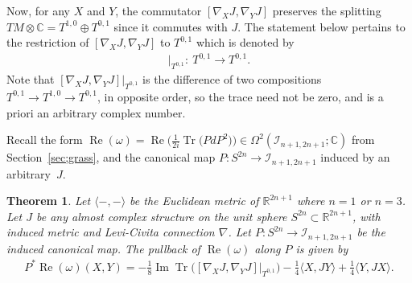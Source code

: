 \documentclass[11pt]{article}
\DeclareMathOperator{\Tr}{Tr}
\newtheorem{thm}{Theorem}[section]
\numberwithin{equation}{section}
\newcommand{\R}{\mathbb{R}}
\newcommand{\CC}{\mathbb{C}}
\newcommand{\cI}{{\mathcal I}}
\begin{document}
 Now, for any $X$ and $Y$, the commutator $[\nabla_X J, \nabla_Y J]$ preserves the splitting $TM \otimes \CC = T^{1,0} \oplus T^{0,1}$ since it commutes with $J$. The statement below pertains to the restriction of $[\nabla_X J, \nabla_Y J]$ to $T^{0,1}$ which is denoted by
 \begin{gather*}
[ \nabla_X J , \nabla_Y J ] \big|_{T^{0,1}} \colon \ T^{0,1} \to T^{0,1}.
 \end{gather*}
 Note that $ [ \nabla_X J , \nabla_Y J ] \big|_{T^{0,1}}$ is the difference of two compositions $T^{0,1} \to T^{1,0} \to T^{0,1}$, in opposite order, so the trace need not be zero, and is a priori an arbitrary complex number.

Recall the form $\operatorname{Re}(\omega) = \operatorname{Re}\big( \frac{1}{ 2i} \Tr\big(PdP^2\big) \big) \in \Omega^2(\cI_{n+1,2n+1};\CC)$ from Section~\ref{sec;grass}, and the cano\-ni\-cal map $P\colon S^{2n} \to \cI_{n+1,2n+1}$ induced by an arbitrary~$J$.

\begin{thm} \label{thm;Pcanon}
Let $\langle -,- \rangle $ be the Euclidean metric of $\R^{2n+1}$ where $n=1$ or $n=3$. Let $J$ be any almost complex structure on the unit sphere $S^{2n} \subset \R^{2n+1}$, with induced metric and Levi-Civita connection $\nabla$. Let $P\colon S^{2n} \to \cI_{n+1,2n+1}$ be the induced canonical map. The pullback of $\operatorname{Re}(\omega)$ along $P$ is given by
\begin{gather*}
 P^* \operatorname{Re} ( \omega) (X,Y) =-\frac{1}{8} \operatorname{Im} \Tr \big([ \nabla_X J , \nabla_Y J ] \big|_{T^{0,1}} \big)
 - \frac 1 4 \langle X,JY \rangle + \frac 1 4 \langle Y,JX \rangle .
\end{gather*}
\end{thm}
\end{document}
